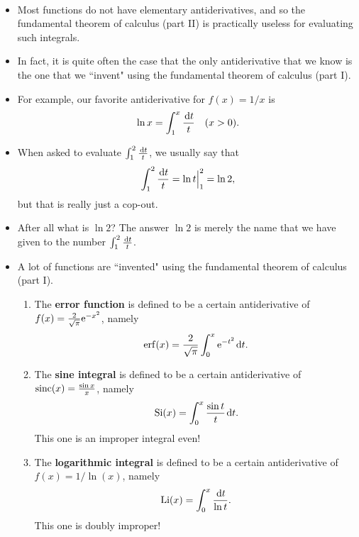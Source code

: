 \setcounter{chapter}{8}
\setcounter{section}{7}
\setcounter{theorem}{0}
\setcounter{equation}{0}


\begin{remark}\,
\begin{itemize}
\item 
Most functions do not have elementary antiderivatives, and so the fundamental theorem of calculus (part II) is practically useless for evaluating such integrals.
\item In fact, it is quite often the case that the only antiderivative that we know is the one that we ``invent" using the fundamental theorem of calculus (part I).
\item For example, our favorite antiderivative for $f(x)=1/x$ is 
\begin{equation*}
\ln x = \int_1^x\frac{\mkern 2mu \mathrm{d} t}{t} \quad (x>0).
\end{equation*}
\item When asked to evaluate $\int_1^2\frac{\mkern 2mu \mathrm{d} t}{t}$, we usually say that
\begin{equation*}
\int_1^2\frac{\mkern 2mu \mathrm{d} t}{t} = \ln t\Big|_1^2 = \ln 2,
\end{equation*}
but that is really just a cop-out. 
\item After all what is $\ln 2$?  The answer $\ln 2$ is merely the name that we have given to the number 
$\int_1^2\frac{\mkern 2mu \mathrm{d} t}{t}$.
\item A lot of functions are ``invented" using the fundamental theorem of calculus (part I).
\begin{enumerate}
\item The \textbf{error function} is defined to be a certain antiderivative of $f(x) = \frac{2}{\sqrt\pi}\mathrm{e}^{-x^2}$, namely
\begin{equation*}
\operatorname{erf} (x) = \frac{2}{\sqrt\pi}\int_0^x\mathrm{e}^{-t^2}\mkern 2mu \mathrm{d} t.
\end{equation*}
\item The \textbf{sine integral} is defined to be a certain antiderivative of $\operatorname{sinc}(x) = \frac{\sin x}{x}$, namely
\begin{equation*}
\operatorname{Si}(x) = \int_0^x\frac{\sin t}{t}\mkern 2mu \mathrm{d} t.
\end{equation*}
This one is an improper integral even!
\item The \textbf{logarithmic integral} is defined to be a certain antiderivative of $f(x) = 1/\ln (x)$, namely
\begin{equation*}
\operatorname{Li}(x) = \int_0^x\frac{\mkern 2mu \mathrm{d} t}{\ln t}.
\end{equation*}
This one is doubly improper!
\end{enumerate}
\end{itemize}
\end{remark}



